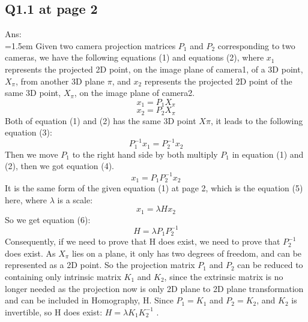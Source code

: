\documentclass[12pt]{article}
\begin{document}
	\subsection*{Q1.1 at page 2}
	Ans:\\
	\hangindent=1.5em \hspace{1.5em} Given two camera projection matrices $P_1$ and $P_2$ corresponding to two cameras, we have the following equations (1) and equations (2), where $x_1$ represents the projected 2D point, on the image plane of camera1, of a 3D point, $X_\pi$, from another 3D plane $\pi$, and $x_2$ represents the projected 2D point of the same 3D point, $X_\pi$, on the image plane of camera2. 
	\begin{equation}
		x_1 = P_1 X_\pi
	\end{equation}
		\begin{equation}
		x_2 = P_2 X_\pi
	\end{equation}
	Both of equation (1) and (2) has the same 3D point $X\pi$, it leads to the following equation (3):
	\begin{equation}
		P_1^{-1}x_1 = P_2^{-1} x_2
	\end{equation}
	Then we move $P_1$ to the right hand side by both multiply $P_1$ in equation (1) and (2), then we got equation (4).
	\begin{equation}
		x_1 = P_1 P^{-1}_2 x_2
	\end{equation}
	It is the same form of the given equation (1) at page 2, which is the equation (5) here, where $\lambda$ is a scale:
	\begin{equation}
		x_1 = \lambda H x_2
	\end{equation}
	So we get equation (6):
	\begin{equation}
		H = \lambda P_1 P_2^{-1}
	\end{equation}
	Consequently, if we need to prove that H does exist, we need to prove that $P_2^{-1}$ does exist.
	As $X_\pi$ lies on a plane, it only has two degrees of freedom, and can be represented as a 2D point. So the projection matrix $P_1$ and $P_2$ can be reduced to containing only intrinsic matrix $K_1$ and $K_2$, since the extrinsic matrix is no longer needed as the projection now is only 2D plane to 2D plane transformation and can be included in Homography, H. Since $P_1 = K_1$ and $P_2 = K_2$, and $K_2$ is invertible, so H does exist: $H = \lambda K_1 K_2^{-1}$ .
	
	
	\newpage
\end{document}
